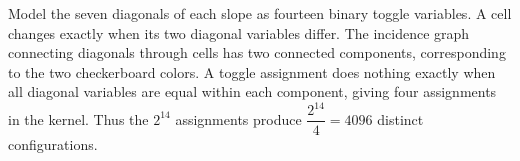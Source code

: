 Model the seven diagonals of each slope as fourteen binary toggle variables. A cell changes exactly when its two diagonal variables differ. The incidence graph connecting diagonals through cells has two connected components, corresponding to the two checkerboard colors. A toggle assignment does nothing exactly when all diagonal variables are equal within each component, giving four assignments in the kernel. Thus the $2^{14}$ assignments produce $\dfrac{2^{14}}{4}=\boxed{4096}$ distinct configurations.
